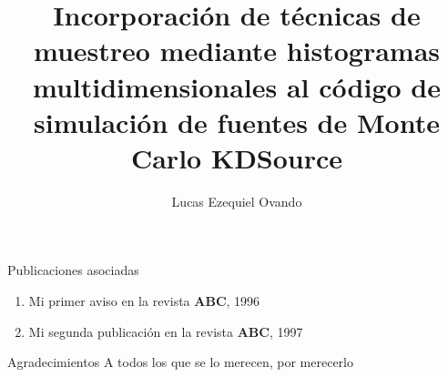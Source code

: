 \documentclass[screen,pagebackref]{ibtesis}
\title{Incorporación de técnicas de muestreo mediante histogramas multidimensionales al código de
simulación de fuentes de Monte Carlo KDSource}
\author{Lucas Ezequiel Ovando}
\begin{document}

\begin{preliminary}



\begin{abreviaturas}
\end{abreviaturas}

\tableofcontents                %

\listoffigures                  %

\listoftables                   %



\end{preliminary}







\appendix


\begin{biblio}

\end{biblio}


\begin{postliminary}

\begin{seccion}{Publicaciones asociadas}
  \begin{enumerate}
  \item Mi primer aviso en la revista \textbf{ABC}, 1996
  \item Mi segunda publicaci\'{o}n en la revista \textbf{ABC}, 1997
  \end{enumerate}
\end{seccion}

\begin{seccion}{Agradecimientos}
A todos los que se lo merecen, por merecerlo
\end{seccion}

\end{postliminary}
\end{document}
